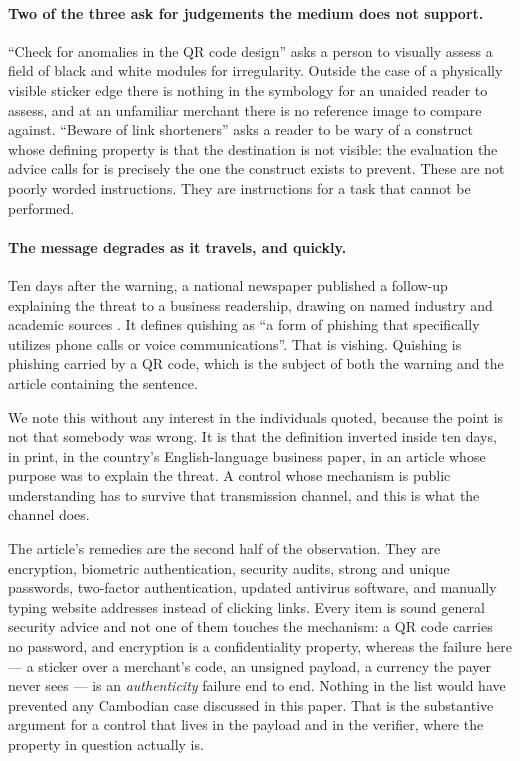 \documentclass[10pt,a4paper,twocolumn]{article}
\begin{document}
\paragraph{Two of the three ask for judgements the medium does not support.}
``Check for anomalies in the QR code design'' asks a person to visually assess a
field of black and white modules for irregularity. Outside the case of a
physically visible sticker edge there is nothing in the symbology for an unaided
reader to assess, and at an unfamiliar merchant there is no reference image to
compare against. ``Beware of link shorteners'' asks a reader to be wary of a
construct whose defining property is that the destination is not visible: the
evaluation the advice calls for is precisely the one the construct exists to
prevent. These are not poorly worded instructions. They are instructions for a
task that cannot be performed.

\paragraph{The message degrades as it travels, and quickly.}
Ten days after the warning, a national newspaper published a follow-up
explaining the threat to a business readership, drawing on named
industry and academic sources \citep{khmertimes2024counter}. It defines quishing
as ``a form of phishing that specifically utilizes phone calls or voice
communications''. That is vishing. Quishing is phishing carried by a QR code,
which is the subject of both the warning and the article containing the
sentence.

We note this without any interest in the individuals quoted, because the point
is not that somebody was wrong. It is that the definition inverted inside ten
days, in print, in the country's English-language business paper, in an article
whose purpose was to explain the threat. A control whose mechanism is public
understanding has to survive that transmission channel, and this is what the
channel does.

The article's remedies are the second half of the observation. They are
encryption, biometric authentication, security audits, strong and unique
passwords, two-factor authentication, updated antivirus software, and manually
typing website addresses instead of clicking links. Every item is sound general
security advice and not one of them touches the mechanism: a QR code carries no
password, and encryption is a confidentiality property, whereas the failure
here --- a sticker over a merchant's code, an unsigned payload, a currency the
payer never sees --- is an \emph{authenticity} failure end to end. Nothing in the
list would have prevented any Cambodian case discussed in this paper. That is
the substantive argument for a control that lives in the payload and in the
verifier, where the property in question actually is.
\end{document}
